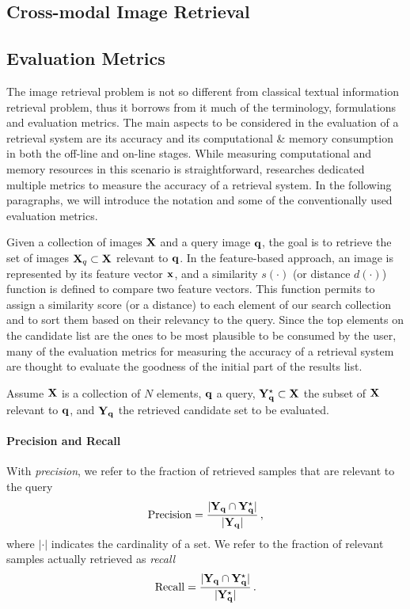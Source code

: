 \subsection{Cross-modal Image Retrieval}


\subsection{Evaluation Metrics}
The image retrieval problem is not so different from classical textual information retrieval problem, thus it borrows from it much of the terminology, formulations and evaluation metrics.
The main aspects to be considered in the evaluation of a retrieval system are its accuracy and its computational \& memory consumption in both the off-line and on-line stages.
While measuring computational and memory resources in this scenario is straightforward, researches dedicated multiple metrics to measure the accuracy of a retrieval system.
In the following paragraphs, we will introduce the notation and some of the conventionally used evaluation metrics.

Given a collection of images $\mathbf{X}$ and a query image $\mathbf{q}$, the goal is to retrieve the set of images $\mathbf{X}_q \subset \mathbf{X}$ relevant to $\mathbf{q}$.
In the feature-based approach, an image is represented by its feature vector $\mathbf{x}$, and a similarity $s(\cdot)$ (or distance $d(\cdot)$) function is defined to compare two feature vectors.
This function permits to assign a similarity score (or a distance) to each element of our search collection and to sort them based on their relevancy to the query.
Since the top elements on the candidate list are the ones to be most plausible to be consumed by the user, many of the evaluation metrics for measuring the accuracy of a retrieval system are thought to evaluate the goodness of the initial part of the results list.

Assume $\mathbf{X}$ %
is a collection of $N$ elements, $\mathbf{q}$ a query, $\mathbf{Y}^{\star}_{\mathbf{q}} \subset \mathbf{X}$ the subset of $\mathbf{X}$ relevant to $\mathbf{q}$, and $\mathbf{Y}_{\mathbf{q}}$ the retrieved candidate set to be evaluated.
\paragraph{Precision and Recall}
With \emph{precision}, we refer to the fraction of retrieved samples that are relevant to the query
\begin{equation} \label{eq:back:precision}
\mathrm{Precision} = \frac{|\mathbf{Y}_{\mathbf{q}} \cap \mathbf{Y}^{\star}_{\mathbf{q}}|}{|\mathbf{Y}_{\mathbf{q}}|} \,,
\end{equation}
where $|\cdot|$ indicates the cardinality of a set.
We refer to the fraction of relevant samples actually retrieved as \emph{recall}
\begin{equation} \label{eq:back:recall}
\mathrm{Recall} = \frac{|\mathbf{Y}_{\mathbf{q}} \cap \mathbf{Y}^{\star}_{\mathbf{q}}|}{|\mathbf{Y}^{\star}_{\mathbf{q}}|} \,.
\end{equation}

